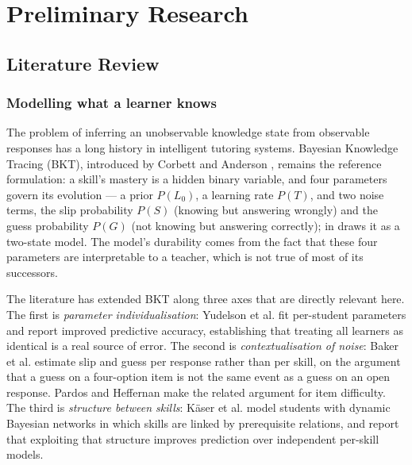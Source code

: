 \chapter{Preliminary Research}
\label{ch:research}

\section{Literature Review}
\label{sec:literature}

\subsection{Modelling what a learner knows}

The problem of inferring an unobservable knowledge state from observable
responses has a long history in intelligent tutoring systems. Bayesian
Knowledge Tracing (BKT), introduced by Corbett and Anderson
\cite{corbett1995knowledge}, remains the reference formulation: a skill's
mastery is a hidden binary variable, and four parameters govern its evolution
--- a prior $P(L_0)$, a learning rate $P(T)$, and two noise terms, the slip
probability $P(S)$ (knowing but answering wrongly) and the guess probability
$P(G)$ (not knowing but answering correctly);  in
 draws it as a two-state model. The model's durability comes from
the fact that these four parameters are interpretable to a teacher, which is not
true of most of its successors.

The literature has extended BKT along three axes that are directly relevant
here. The first is \emph{parameter individualisation}: Yudelson et al.
\cite{yudelson2013individualized} fit per-student parameters and report
improved predictive accuracy, establishing that treating all learners as
identical is a real source of error. The second is \emph{contextualisation of
noise}: Baker et al. \cite{baker2008more} estimate slip and guess per response
rather than per skill, on the argument that a guess on a four-option item is not
the same event as a guess on an open response. Pardos and Heffernan
\cite{pardos2011kt} make the related argument for item difficulty. The third is
\emph{structure between skills}: Käser et al. \cite{kaser2017dynamic} model
students with dynamic Bayesian networks in which skills are linked by
prerequisite relations, and report that exploiting that structure improves
prediction over independent per-skill models.

